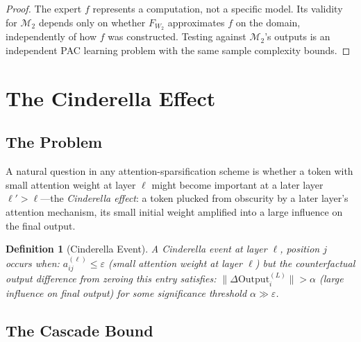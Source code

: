 \documentclass[11pt]{article}
\newtheorem{definition}{Definition}
\begin{document}
\begin{proof}
The expert $f$ represents a computation, not a specific model.  Its validity
for $\mathcal{M}_2$ depends only on whether $F_{W_2}$ approximates $f$ on the
domain, independently of how $f$ was constructed.  Testing against $\mathcal{M}_2$'s
outputs is an independent PAC learning problem with the same sample complexity
bounds.
\end{proof}

\section{The Cinderella Effect}
\label{sec:cinderella}

\subsection{The Problem}

A natural question in any attention-sparsification scheme is whether a token
with small attention weight at layer $\ell$ might become important at a later
layer $\ell' > \ell$---the \emph{Cinderella effect}: a token plucked from
obscurity by a later layer's attention mechanism, its small initial weight
amplified into a large influence on the final output.

\begin{definition}[Cinderella Event]
\label{def:cinderella}
A \emph{Cinderella event} at layer $\ell$, position $j$ occurs when:
$a^{(\ell)}_{ij} \leq \varepsilon$ (small attention weight at layer $\ell$)
but the counterfactual output difference from zeroing this entry satisfies:
$\|\Delta \mathrm{Output}^{(L)}_i\| > \alpha$ (large influence on final output)
for some significance threshold $\alpha \gg \varepsilon$.
\end{definition}

\subsection{The Cascade Bound}
\end{document}
